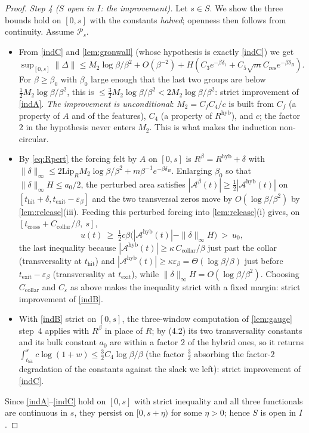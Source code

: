 \documentclass[11pt]{article}
\theoremstyle{definition}
\theoremstyle{remark}
\newcommand{\hyb}{\mathrm{hyb}}
\newcommand{\thit}{t_{\mathrm{hit}}}
\newcommand{\texit}{t_{\mathrm{exit}}}
\newcommand{\tcross}{t_{\mathrm{cross}}}
\newcommand{\Ar}{\mathcal{A}}
\begin{document}
\begin{proof}
\emph{Step 4 ($S$ open in $I$: the improvement).} Let $s\in S$. We show the three
bounds hold on $[0,s]$ with the constants \emph{halved}; openness then follows
from continuity. Assume $\mathcal P_s$.
\begin{itemize}
\item[(4.1)] From \eqref{indC} and \cref{lem:gronwall} (whose hypothesis is
exactly \eqref{indC}) we get
$\sup_{[0,s]}\|\Delta\|\le M_2\log\beta/\beta^2+O(\beta^{-2})+
H(C_3e^{-\beta\delta_1}+C_5\sqrt mC_{\mathrm{res}}e^{-\beta\delta_B})$. For
$\beta\ge\beta_0$ with $\beta_0$ large enough that the last two groups are below
$\tfrac12M_2\log\beta/\beta^2$, this is
$\le\tfrac32M_2\log\beta/\beta^2<2M_2\log\beta/\beta^2$: strict improvement of
\eqref{indA}. \emph{The improvement is unconditional}: $M_2=C_fC_4/c$ is built
from $C_f$ (a property of $A$ and of the features), $C_4$ (a property of
$R^{\hyb}$), and $c$; the factor $2$ in the hypothesis never enters $M_2$. This
is what makes the induction non-circular.
\item[(4.2)] By \eqref{eq:Rpert} the forcing felt by $A$ on $[0,s]$ is
$R^\beta=R^{\hyb}+\delta$ with
$\|\delta\|_\infty\le2\mathrm{Lip}_RM_2\log\beta/\beta^2+m\beta^{-1}e^{-\beta\delta_B}$.
Enlarging $\beta_0$ so that $\|\delta\|_\infty H\le a_0/2$, the perturbed area
satisfies $|\Ar^\beta(t)|\ge\tfrac12|\Ar^{\hyb}(t)|$ on
$[\thit+\delta,\texit-\varepsilon_\beta]$ and the two transversal zeros move by
$O(\log\beta/\beta^2)$ by \cref{lem:release}(iii). Feeding this perturbed forcing
into \cref{lem:release}(i) gives, on
$[\tcross+C_{\mathrm{collar}}/\beta,\ s]$,
\[
u(t)\ \ge\ \tfrac12c\beta\bigl(|\Ar^{\hyb}(t)|-\|\delta\|_\infty H\bigr)\ >\ u_0 ,
\]
the last inequality because $|\Ar^{\hyb}(t)|\ge\kappa\,C_{\mathrm{collar}}/\beta$
just past the collar (transversality at $\thit$) and
$|\Ar^{\hyb}(t)|\ge\kappa\varepsilon_\beta=\Theta(\log\beta/\beta)$ just before
$\texit-\varepsilon_\beta$ (transversality at $\texit$), while
$\|\delta\|_\infty H=O(\log\beta/\beta^2)$. Choosing $C_{\mathrm{collar}}$ and
$C_\varepsilon$ as above makes the inequality strict with a fixed margin: strict
improvement of \eqref{indB}.
\item[(4.3)] With \eqref{indB} strict on $[0,s]$, the three-window computation of
\cref{lem:gauge} step~4 applies with $R^\beta$ in place of $R$; by (4.2) its two
transversality constants and its bulk constant $a_0$ are within a factor $2$ of
the hybrid ones, so it returns
$\int_{\thit}^{s}c\log(1+w)\le\tfrac32 C_4\log\beta/\beta$ (the factor $\tfrac32$
absorbing the factor-$2$ degradation of the constants against the slack we left):
strict improvement of \eqref{indC}.
\end{itemize}
Since \eqref{indA}--\eqref{indC} hold on $[0,s]$ with strict inequality and all
three functionals are continuous in $s$, they persist on $[0,s+\eta)$ for some
$\eta>0$; hence $S$ is open in $I$.


\end{proof}
\end{document}
